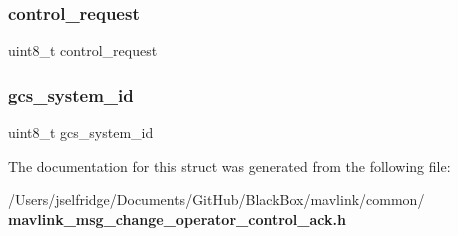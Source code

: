 \subsubsection{control\+\_\+request}
{\footnotesize\ttfamily uint8\+\_\+t control\+\_\+request}

\mbox{\label{struct____mavlink__change__operator__control__ack__t_a8f4890d9822c22dbe6f204bb622392e1}} 
\subsubsection{gcs\+\_\+system\+\_\+id}
{\footnotesize\ttfamily uint8\+\_\+t gcs\+\_\+system\+\_\+id}



The documentation for this struct was generated from the following file\+:\begin{DoxyCompactItemize}
\item 
/\+Users/jselfridge/\+Documents/\+Git\+Hub/\+Black\+Box/mavlink/common/\textbf{ mavlink\+\_\+msg\+\_\+change\+\_\+operator\+\_\+control\+\_\+ack.\+h}\end{DoxyCompactItemize}
